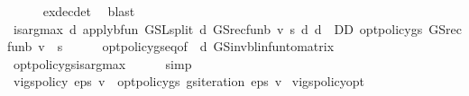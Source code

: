 \begin{isabellebody}
\ \ \ \ \isamarkupfalse%
\ ex{\isacharunderscore}{\kern0pt}dec{\isacharunderscore}{\kern0pt}det\ \isamarkupfalse%
\ blast\isanewline
\ \ \isamarkupfalse%
\ {\isachardoublequoteopen}is{\isacharunderscore}{\kern0pt}arg{\isacharunderscore}{\kern0pt}max\ {\isacharparenleft}{\kern0pt}{\isasymlambda}d{\isachardot}{\kern0pt}\ apply{\isacharunderscore}{\kern0pt}bfun\ {\isacharparenleft}{\kern0pt}GS{\isachardot}{\kern0pt}L{\isacharunderscore}{\kern0pt}split\ d\ {\isacharparenleft}{\kern0pt}GS{\isacharunderscore}{\kern0pt}rec{\isacharunderscore}{\kern0pt}fun\isactrlsub b\ v{\isacharparenright}{\kern0pt}{\isacharparenright}{\kern0pt}\ s{\isacharparenright}{\kern0pt}\ {\isacharparenleft}{\kern0pt}{\isasymlambda}d{\isachardot}{\kern0pt}\ d\ {\isasymin}\ D\isactrlsub D{\isacharparenright}{\kern0pt}\ {\isacharparenleft}{\kern0pt}opt{\isacharunderscore}{\kern0pt}policy{\isacharunderscore}{\kern0pt}gs\ {\isacharparenleft}{\kern0pt}GS{\isacharunderscore}{\kern0pt}rec{\isacharunderscore}{\kern0pt}fun\isactrlsub b\ v{\isacharparenright}{\kern0pt}{\isacharparenright}{\kern0pt}{\isachardoublequoteclose}\ \ s\isanewline
\ \ \ \ \isamarkupfalse%
\ opt{\isacharunderscore}{\kern0pt}policy{\isacharunderscore}{\kern0pt}gs{\isacharunderscore}{\kern0pt}eq{\isacharprime}{\kern0pt}{\isacharbrackleft}{\kern0pt}of\ {\isacharunderscore}{\kern0pt}\ d{\isacharbrackright}{\kern0pt}\ GS{\isacharunderscore}{\kern0pt}inv{\isacharunderscore}{\kern0pt}blinfun{\isacharunderscore}{\kern0pt}to{\isacharunderscore}{\kern0pt}matrix\ \isanewline
\ \ \ \ \isamarkupfalse%
\ opt{\isacharunderscore}{\kern0pt}policy{\isacharunderscore}{\kern0pt}gs{\isacharprime}{\kern0pt}{\isacharunderscore}{\kern0pt}is{\isacharunderscore}{\kern0pt}arg{\isacharunderscore}{\kern0pt}max\isanewline
\ \ \ \ \isamarkupfalse%
\ simp\isanewline
{}\isamarkupfalse%
%
\endisatagproof
{\isafoldproof}%
%
\isadelimproof
\isanewline
%
\endisadelimproof
\isanewline
{}\isamarkupfalse%
\ {\isachardoublequoteopen}vi{\isacharunderscore}{\kern0pt}gs{\isacharunderscore}{\kern0pt}policy\ eps\ v\ {\isacharequal}{\kern0pt}\ opt{\isacharunderscore}{\kern0pt}policy{\isacharunderscore}{\kern0pt}gs\ {\isacharparenleft}{\kern0pt}gs{\isacharunderscore}{\kern0pt}iteration\ eps\ v{\isacharparenright}{\kern0pt}{\isachardoublequoteclose}\isanewline
\isanewline
{}\isamarkupfalse%
\ vi{\isacharunderscore}{\kern0pt}gs{\isacharunderscore}{\kern0pt}policy{\isacharunderscore}{\kern0pt}opt{\isacharcolon}{\kern0pt}\isanewline

\end{isabellebody}
